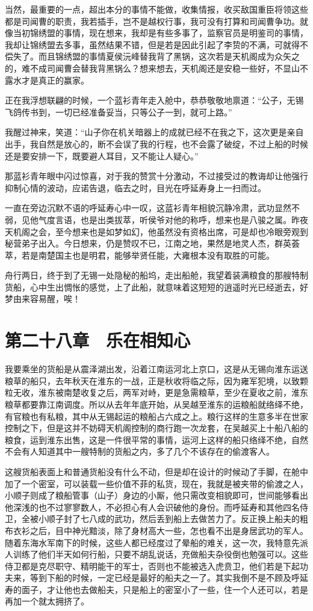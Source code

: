 当然，最重要的一点，超出本分的事情不能做，收集情报，收买敌国重臣将领这些都是司闻曹的职责，我若插手，岂不是越权行事，我可没有打算和司闻曹争功。就像当初锦绣盟的事情，现在想来，我却是有些多事了，监察官员是明鉴司的事情，我却让锦绣盟去多事，虽然结果不错，但是若是因此引起了李贽的不满，可就得不偿失了。而且锦绣盟的事情夏侯沅峰替我背了黑锅，这次若是天机阁成为众矢之的，难不成司闻曹会替我背黑锅么？想来想去，天机阁还是安稳一些好，不显山不露水才是真正的赢家。

正在我浮想联翩的时候，一个蓝衫青年走入舱中，恭恭敬敬地禀道：“公子，无锡飞鸽传书到，一切已经准备妥当，只等公子一到，就可上路。”

我醒过神来，笑道：“山子你在机关暗器上的成就已经不在我之下，这次更是亲自出手，我自然是放心的，断不会误了我的行程，也不会露了破绽，不过上船的时候还是要安排一下，既要避人耳目，又不能让人疑心。”

那蓝衫青年眼中闪过惊喜，对于我的赞赏十分激动，不过接受过的教诲却让他强行抑制心情的波动，应诺告退，临去之时，目光在呼延寿身上一扫而过。

一直在旁边沉默不语的呼延寿心中一叹，这蓝衫青年相貌沉静冷肃，武功显然不弱，见他气度言语，也是出类拔萃，听侯爷对他的称呼，想来也是八骏之属。昨夜天机阁之会，至今想来也是如梦如幻，他虽然没有资格出席，可是却也冷眼旁观到秘营弟子出入。今日想来，仍是赞叹不已，江南之地，果然是地灵人杰，群英荟萃，若是南楚国主也是明君，能够举贤任能，大雍根本没有取胜的可能。

舟行两日，终于到了无锡一处隐秘的船坞，走出船舱，我望着装满粮食的那艘特制货船，心中生出惆怅的感觉，上了此船，就意味着这短短的逍遥时光已经逝去，好梦由来容易醒，唉！

\chapter{第二十八章　乐在相知心}

我要乘坐的货船是从震泽湖出发，沿着江南运河北上京口，这是从无锡向淮东运送粮草的船只，去年秋天在淮东的一战，正是秋收将临之际，因为雍军犯境，以致颗粒无收，淮东被南楚收复之后，两军对峙，更是急需粮草，至少在夏收之前，淮东粮草都要靠江南调度。所以从去年年底开始，从吴越至淮东的运粮船就络绎不绝，有官粮也有私粮，其中从无锡起运的粮船占六成之上。粮行这样的生意多半在世家控制之下，但是这并不妨碍天机阁控制的商行跑一次龙套，在吴越买上十船八船的粮食，运到淮东出售，这是一件很平常的事情，运河上这样的船只络绎不绝，自然不会有人知道其中一艘特制的货船之内，多了几个不该存在的偷渡客人。

这艘货船表面上和普通货船没有什么不动，但是却在设计的时候动了手脚，在舱中加了一个密室，可以装载一些价值不菲的私货，现在，我就是被夹带的偷渡之人，小顺子则成了粮船管事（山子）身边的小厮，他只需改变相貌即可，世间能够看出他深浅的也不过寥寥数人，不必担心有人会识破他的身份。而呼延寿和其他四名侍卫，全被小顺子封了七八成的武功，然后丢到船上去做苦力了。反正换上船夫的粗布衣衫之后，目中神光黯淡，除了身材高大一些，怎也看不出是身居武功的军人。随着东海水军南下的时候，这些人都已经度过了晕船的难关，这一次，我特意先派人训练了他们半天如何行船，只要不胡乱说话，充做船夫杂役倒也勉强可以。这些侍卫都是克尽职守、精明能干的军士，否则也不能被选入虎贲卫，他们若是下起功夫来，等到下船的时候，一定已经是最好的船夫之一了。其实我倒不是不顾及呼延寿的面子，才让他也去做船夫，只是船上的密室小了一些，住一个人还可以，若是再加一个就太拥挤了。


